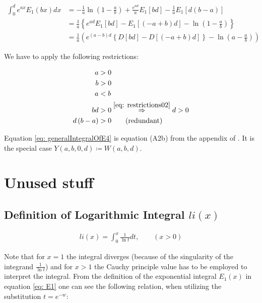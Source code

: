 \documentclass[bibliography=totocnumbered]{scrartcl}
\newcommand{\assume}[1][\text{MISSING PARAMETER}]{,\qquad\left(#1\right)}
\begin{document}
	\begin{align}
		\int_{0}^{d}e^{ax}E_1\left(bx\right)dx&=-\frac{1}{a}\ln\left(1-\frac{a}{b}\right)+\frac{e^{ad}}{a}E_1\left[bd\right]-\frac{1}{a}E_1\left[d\left(b-a\right)\right]\\
		&=\frac{1}{a}\left\{e^{ad}E_1\left[bd\right]-E_1\left[\left(-a+b\right)d\right]-\ln{\left(1-\frac{a}{b}\right)}\right\}\\
		&=\frac{1}{a}\left(e^{\left(a-b\right)d}\left\{D\left[bd\right]-D\left[\left(-a+b\right)d\right]\right\}-\ln{\left(a-\frac{a}{b}\right)}\right)\label{eq: generalIntegralOfE4}
	\end{align}
	
	We have to apply the following restrictions:
	
	\begin{subequations}
		\begin{align}
			a&>0\label{eq: restrictions01}\\
			b&>0\label{eq: restrictions02}\\
			a&<b\label{eq: restrictions03}\\
			bd&>0\overset{\eqref{eq: restrictions02}}{\Rightarrow}d>0\\
			d\left(b-a\right)&>0\qquad\text{(redundant)}
		\end{align}
	\end{subequations}
	
	Equation \eqref{eq: generalIntegralOfE4} is equation (A2b) from the appendix of \cite{boer1990calc}. It is the special case $Y\left(a,b,0,d\right)\coloneqq{}W\left(a,b,d\right)$.
	
	\clearpage
	\printbibliography
	\clearpage
	\appendix
	
	\section{Unused stuff}
	
		\subsection[Definition of Logarithmic Integral li(x)]{Definition of Logarithmic Integral $li\left(x\right)$}
		\label{appsubsec: li}
		
			\begin{gather}
			li\left(x\right)=\int_{0}^{x}\frac{1}{\ln{t}}dt\assume[x>0]\label{eq: li}
			\end{gather}
			
			Note that for $x=1$ the integral diverges (because of the singularity of the integrand $\frac{1}{\ln{t}}$) and for $x>1$ the Cauchy principle value has to be employed to interpret the integral. From the definition of the exponential integral $E_1\left(x\right)$ in equation \eqref{eq: E1} one can see the following relation, when utilizing the substitution $t=e^{-w}$:
			
\end{document}
